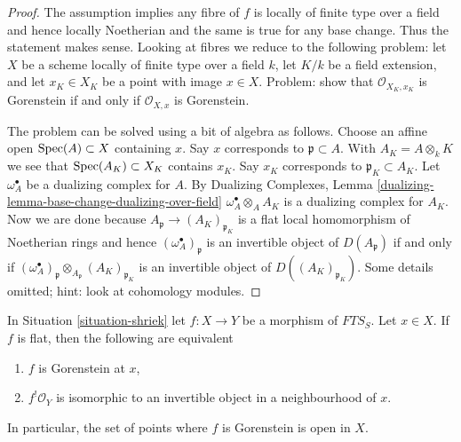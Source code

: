 \begin{proof}
The assumption implies any fibre of $f$ is locally of finite type
over a field and hence locally Noetherian and the same is true for
any base change. Thus the statement makes sense. Looking at
fibres we reduce to the following problem: let $X$ be a scheme
locally of finite type over a field $k$,
let $K/k$ be a field extension, and
let $x_K \in X_K$ be a point with image $x \in X$.
Problem: show that $\mathcal{O}_{X_K, x_K}$ is Gorenstein if and only if
$\mathcal{O}_{X, x}$ is Gorenstein.

\medskip\noindent
The problem can be solved using a bit of algebra as follows.
Choose an affine open $\mathop{\mathrm{Spec}}(A) \subset X$ containing $x$.
Say $x$ corresponds to $\mathfrak p \subset A$.
With $A_K = A \otimes_k K$ we see that $\mathop{\mathrm{Spec}}(A_K) \subset X_K$
contains $x_K$. Say $x_K$ corresponds to $\mathfrak p_K \subset A_K$.
Let $\omega_A^\bullet$ be a dualizing complex for $A$.
By Dualizing Complexes, Lemma
\ref{dualizing-lemma-base-change-dualizing-over-field}
$\omega_A^\bullet \otimes_A A_K$ is a dualizing complex for $A_K$.
Now we are done because
$A_\mathfrak p \to (A_K)_{\mathfrak p_K}$ is a flat local
homomorphism of Noetherian rings and hence
$(\omega_A^\bullet)_\mathfrak p$ is an invertible object
of $D(A_\mathfrak p)$ if and only if
$(\omega_A^\bullet)_\mathfrak p \otimes_{A_\mathfrak p} (A_K)_{\mathfrak p_K}$
is an invertible object of $D((A_K)_{\mathfrak p_K})$.
Some details omitted; hint: look at cohomology modules.
\end{proof}

\begin{lemma}
\label{lemma-affine-flat-Noetherian-gorenstein}
In Situation \ref{situation-shriek} let $f : X \to Y$ be a morphism
of $\textit{FTS}_S$. Let $x \in X$. If $f$ is flat, then
the following are equivalent
\begin{enumerate}
\item $f$ is Gorenstein at $x$,
\item $f^!\mathcal{O}_Y$ is isomorphic to an invertible object
in a neighbourhood of $x$.
\end{enumerate}
In particular, the set of points where $f$ is Gorenstein is
open in $X$.
\end{lemma}


